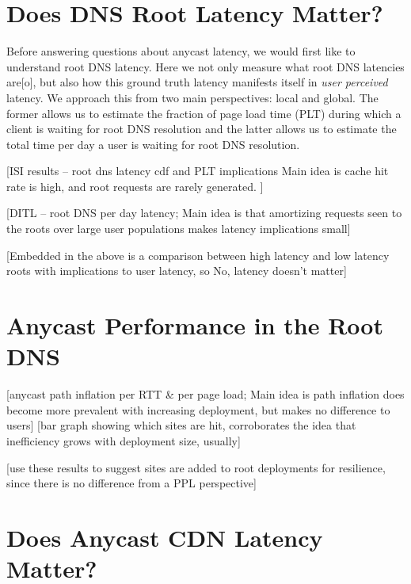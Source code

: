 \documentclass[sigconf,letterpaper,nonacm,10pt]{acmart}
\begin{document}
\hypertarget{does-dns-root-latency-matter}{%
\section{Does DNS Root Latency
Matter?}\label{does-dns-root-latency-matter}}

\label{sec:root_dns_latency} Before answering questions about anycast
latency, we would first like to understand root DNS latency. Here we not
only measure what root DNS latencies are{[}o{]}, but also how this
ground truth latency manifests itself in \textit{user perceived}
latency. We approach this from two main perspectives: local and global.
The former allows us to estimate the fraction of page load time (PLT)
during which a client is waiting for root DNS resolution and the latter
allows us to estimate the total time per day a user is waiting for root
DNS resolution.

{[}ISI results -- root dns latency cdf and PLT implications Main idea is
cache hit rate is high, and root requests are rarely generated. {]}

{[}DITL -- root DNS per day latency; Main idea is that amortizing
requests seen to the roots over large user populations makes latency
implications small{]}

{[}Embedded in the above is a comparison between high latency and low
latency roots with implications to user latency, so No, latency doesn't
matter{]}

\hypertarget{anycast-performance-in-the-root-dns}{%
\section{Anycast Performance in the Root
DNS}\label{anycast-performance-in-the-root-dns}}

\label{sec:root_dns_anycast} {[}anycast path inflation per RTT \& per
page load; Main idea is path inflation does become more prevalent with
increasing deployment, but makes no difference to users{]} {[}bar graph
showing which sites are hit, corroborates the idea that inefficiency
grows with deployment size, usually{]}

{[}use these results to suggest sites are added to root deployments for
resilience, since there is no difference from a PPL perspective{]}

\hypertarget{does-anycast-cdn-latency-matter}{%
\section{Does Anycast CDN Latency
Matter?}\label{does-anycast-cdn-latency-matter}}
\end{document}
